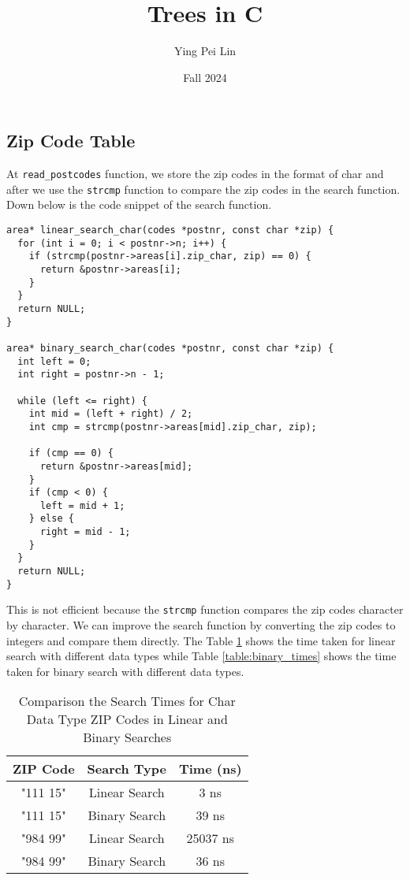\documentclass[a4paper,11pt]{article}
\begin{document}
\title{
  \textbf{Trees in C}
}
\author{Ying Pei Lin}
\date{Fall 2024}

\maketitle

\subsection*{Zip Code Table}

At {\tt read\_postcodes} function, we store the zip codes in the format of char and after
we use the {\tt strcmp} function to compare the zip codes in the search function. Down below
is the code snippet of the search function.

\begin{verbatim}
area* linear_search_char(codes *postnr, const char *zip) {
  for (int i = 0; i < postnr->n; i++) {
    if (strcmp(postnr->areas[i].zip_char, zip) == 0) {
      return &postnr->areas[i];
    }
  }
  return NULL;
}

area* binary_search_char(codes *postnr, const char *zip) {
  int left = 0;
  int right = postnr->n - 1;
  
  while (left <= right) {
    int mid = (left + right) / 2;
    int cmp = strcmp(postnr->areas[mid].zip_char, zip);
    
    if (cmp == 0) {
      return &postnr->areas[mid];
    }
    if (cmp < 0) {
      left = mid + 1;
    } else {
      right = mid - 1;
    }
  }
  return NULL;
}
\end{verbatim}

This is not efficient because the {\tt strcmp} function compares the zip codes character by character.
We can improve the search function by converting the zip codes to integers and compare them directly.
The Table \ref{table:linear_times} shows the time taken for linear search with different data types
while Table \ref{table:binary_times} shows the time taken for binary search with different data types.

\begin{table}[h!]
  \centering
  \begin{tabular}{|c|c|c|}
    \hline
    \textbf{ZIP Code} & \textbf{Search Type} & \textbf{Time (ns)} \\ \hline
    "111 15" & Linear Search & 3 ns \\ \hline
    "111 15" & Binary Search & 39 ns \\ \hline
    "984 99" & Linear Search & 25037 ns \\ \hline
    "984 99" & Binary Search & 36 ns \\ \hline
  \end{tabular}
  \caption{Comparison the Search Times for Char Data Type ZIP Codes in Linear and Binary Searches}
  \label{table:linear_times}
\end{table}
\end{document}
